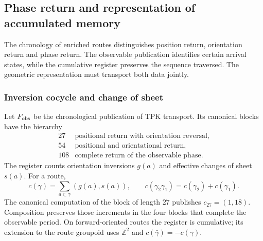 
\subsection{Phase return and representation of accumulated memory}
\label{ii:vii:sec:retorno-memoria-gravedad}

The chronology of enriched routes distinguishes position return,
orientation return and phase return. The observable publication
identifies certain arrival states, while the cumulative register
preserves the sequence traversed. The geometric representation must
transport both data jointly.

\subsubsection{Inversion cocycle and change of sheet}
\label{ii:vii:subsec:cociclo-memoria}

Let \(F_{\rm obs}\) be the chronological publication of TPK transport.
Its canonical blocks have the hierarchy
\[
\begin{array}{c|l}
27&\text{positional return with orientation reversal},\\
54&\text{positional and orientational return},\\
108&\text{complete return of the observable phase}.
\end{array}
\]
The register counts orientation inversions \(g(a)\) and
effective changes of sheet \(s(a)\). For a route,
\begin{equation}
 c(\gamma)=\sum_{a\subset\gamma}(g(a),s(a)),\qquad
 c(\gamma_2\gamma_1)=c(\gamma_2)+c(\gamma_1).
 \label{ii:vii:eq:cociclo-ruta}
\end{equation}
The canonical computation of the block of length \(27\) publishes
\(c_{27}=(1,18)\). Composition preserves those increments in
the four blocks that complete the observable period.
On forward-oriented routes the register is cumulative;
its extension to the route groupoid uses \(\mathbb Z^2\) and
\(c(\bar\gamma)=-c(\gamma)\).

